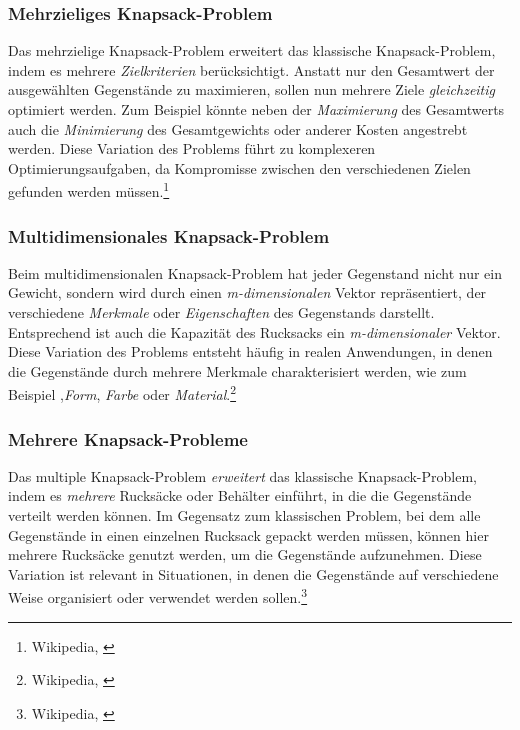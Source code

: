 \begin{itemize}
\subsubsection*{Mehrzieliges Knapsack-Problem}
Das mehrzielige Knapsack-Problem erweitert das klassische Knapsack-Problem, indem es mehrere \textit{Zielkriterien}
berücksichtigt. Anstatt nur den Gesamtwert der ausgewählten Gegenstände zu maximieren, sollen nun mehrere Ziele
\textit{gleichzeitig} optimiert werden. Zum Beispiel könnte neben der \textit{Maximierung} des Gesamtwerts auch die
\textit{Minimierung} des Gesamtgewichts oder anderer Kosten angestrebt werden. Diese Variation des Problems führt zu
komplexeren Optimierungsaufgaben, da Kompromisse zwischen den verschiedenen Zielen gefunden werden müssen.\footnote{Wikipedia, \cite{Multi-objective Knapsack-Problem}}

\subsubsection*{Multidimensionales Knapsack-Problem}
Beim multidimensionalen Knapsack-Problem hat jeder Gegenstand nicht nur ein Gewicht, sondern wird durch einen
\textit{m-dimensionalen} Vektor repräsentiert, der verschiedene \textit{Merkmale} oder \textit{Eigenschaften} des Gegenstands
darstellt. Entsprechend ist auch die Kapazität des Rucksacks ein \textit{m-dimensionaler} Vektor. Diese Variation des
Problems entsteht häufig in realen Anwendungen, in denen die Gegenstände durch mehrere Merkmale charakterisiert werden,
wie zum Beispiel ,\textit{Form}, \textit{Farbe} oder \textit{Material}.\footnote{Wikipedia, \cite{Multi-dimensional Knapsack-Problem}}

\subsubsection*{Mehrere Knapsack-Probleme}
Das multiple Knapsack-Problem \textit{erweitert} das klassische Knapsack-Problem, indem es \textit{mehrere} Rucksäcke
oder Behälter einführt, in die die Gegenstände verteilt werden können. Im Gegensatz zum klassischen Problem, bei dem
alle Gegenstände in einen einzelnen Rucksack gepackt werden müssen, können hier mehrere Rucksäcke genutzt werden, um die
Gegenstände aufzunehmen. Diese Variation ist relevant in Situationen, in denen die Gegenstände auf verschiedene Weise
organisiert oder verwendet werden sollen.\footnote{Wikipedia, \cite{Multi Knapsack-Problem}}


\end{itemize}
